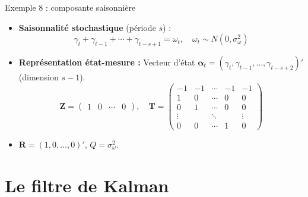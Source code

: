 \documentclass[11pt,aspectratio=169]{beamer}
\begin{document}
\begin{frame}{Exemple 8 : composante saisonnière}

\begin{itemize}

\item \textbf{Saisonnalité stochastique} (période $s$) :
  \[
  \gamma_t + \gamma_{t-1} + \cdots + \gamma_{t-s+1} = \omega_t, \quad \omega_t \sim N(0, \sigma_\omega^2)
  \]\newline

\item \textbf{Représentation état-mesure :} Vecteur d'état $\bm{\alpha}_t = (\gamma_t, \gamma_{t-1}, \ldots, \gamma_{t-s+2})'$ (dimension $s-1$).
  \[
  \bm{Z} = \begin{pmatrix} 1 & 0 & \cdots & 0 \end{pmatrix}, \quad
  \bm{T} = \begin{pmatrix}
      -1 & -1 & \cdots & -1 & -1 \\
      1 & 0 & \cdots & 0 & 0 \\
      0 & 1 & \cdots & 0 & 0 \\
      \vdots & & \ddots & & \vdots \\
      0 & 0 & \cdots & 1 & 0
  \end{pmatrix}
  \]\newline

\item $\bm{R} = (1, 0, \ldots, 0)'$, $Q = \sigma_\omega^2$.

\end{itemize}

\end{frame}

\section{Le filtre de Kalman}
\end{document}
